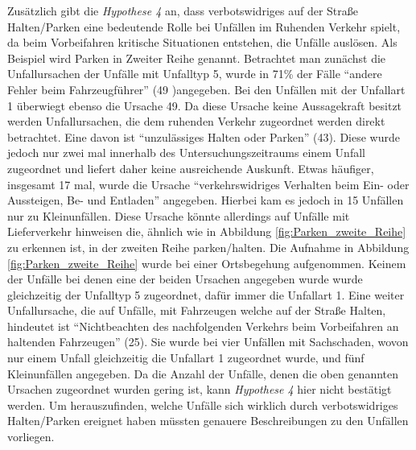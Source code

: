 Zusätzlich gibt die \textit{Hypothese 4} an, dass verbotswidriges auf der Straße Halten/Parken eine bedeutende Rolle bei Unfällen im Ruhenden Verkehr spielt, da beim Vorbeifahren kritische Situationen entstehen, die Unfälle auslösen. Als Beispiel wird Parken in Zweiter Reihe genannt. Betrachtet man zunächst die Unfallursachen der Unfälle mit Unfalltyp 5, wurde in 71\% der Fälle \enquote{andere Fehler beim Fahrzeugführer} (49 )angegeben. Bei den Unfällen mit der Unfallart 1 überwiegt ebenso die Ursache 49.
 Da diese Ursache keine Aussagekraft besitzt werden Unfallursachen, die dem ruhenden Verkehr zugeordnet werden direkt betrachtet. Eine davon ist \enquote{unzulässiges Halten oder Parken} (43). Diese wurde jedoch nur zwei mal innerhalb des Untersuchungszeitraums einem Unfall zugeordnet und liefert daher keine ausreichende Auskunft. Etwas häufiger, insgesamt 17 mal, wurde die Ursache \enquote{verkehrswidriges Verhalten beim Ein- oder Aussteigen, Be- und Entladen} angegeben. Hierbei kam es jedoch in 15 Unfällen nur zu Kleinunfällen. Diese Ursache könnte allerdings auf Unfälle mit Lieferverkehr hinweisen die, ähnlich wie in Abbildung \ref{fig:Parken_zweite_Reihe} zu erkennen ist, in der zweiten Reihe parken/halten. Die Aufnahme in Abbildung \ref{fig:Parken_zweite_Reihe} wurde bei einer Ortsbegehung aufgenommen. Keinem der Unfälle bei denen eine der beiden Ursachen angegeben wurde wurde gleichzeitig der Unfalltyp 5 zugeordnet, dafür immer die Unfallart 1. Eine weiter Unfallursache, die auf Unfälle, mit Fahrzeugen welche auf der Straße Halten, hindeutet ist \enquote{Nichtbeachten des nachfolgenden Verkehrs beim Vorbeifahren an haltenden Fahrzeugen} (25). Sie wurde bei vier Unfällen mit Sachschaden, wovon nur einem Unfall gleichzeitig die Unfallart 1 zugeordnet wurde, und fünf Kleinunfällen angegeben. Da die Anzahl der Unfälle, denen die oben genannten Ursachen zugeordnet wurden gering ist, kann \textit{Hypothese 4} hier nicht bestätigt werden. Um herauszufinden, welche Unfälle sich wirklich durch verbotswidriges Halten/Parken ereignet haben müssten genauere Beschreibungen zu den Unfällen vorliegen. %

